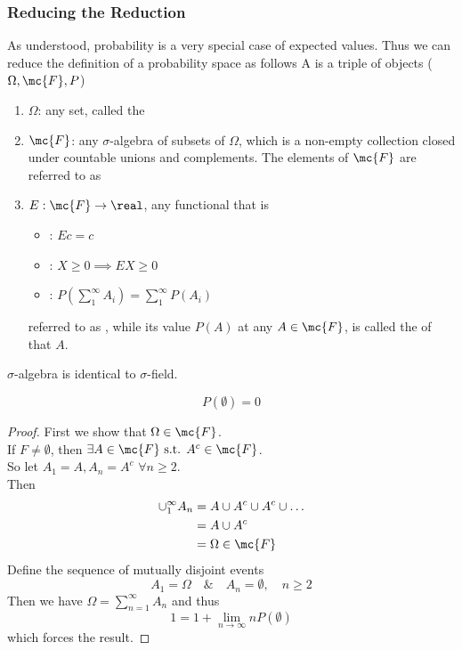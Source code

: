 \documentclass[11pt]{article}
\numberwithin{equation}{section}
\begin{document}
\subsubsection{Reducing the Reduction}
As understood, probability is a very special case of expected values. Thus we can reduce the definition of a probability space as follows
A  is a triple of objects ($\Omega, \mc{F}, P$)
\begin{enumerate}
	\item $\Omega$: any set, called the 
	\item $\mc{F}$: any $\sigma$-algebra of subsets of $\Omega$, which is a non-empty collection closed under countable unions and complements. The elements of $\mc{F}$ are referred to as 
	\item $E: \mc{F} \rightarrow \real$, any functional that is 
	\begin{itemize}
		\item {}: $Ec = c$
		\item {}: $X \geq 0 \implies EX \geq 0$
		\item {}: $P(\sum_1^{\infty}A_i) = \sum_1^{\infty}P(A_i)$
	\end{itemize}
	referred to as , while its value $P(A)$ at any $A \in \mc{F}$, is called the  of that $A$.
\end{enumerate} 

\remark
$\sigma$-algebra is identical to $\sigma$-field.

\proposition[nullity]
$$P(\emptyset) = 0$$
\begin{proof}
	First we show that $\Omega \in \mc{F}$. \\
	If $F \neq \emptyset$, then $\exists A \in \mc{F} \text{ s.t. } A^c \in \mc{F}$. \\
	So let $A_1 = A, A_n = A^c \,\, \forall n \geq 2$. \\
	Then 
	\begin{align*}
		\cup_1^\infty A_n &= A \cup A^c \cup A^c \cup \hdots \\
		&= A \cup A^c \\
		&= \Omega \in \mc{F}
	\end{align*}
	Define the sequence of mutually disjoint events
	$$A_1 = \Omega \quad \& \quad A_n = \emptyset, \quad n \geq 2$$
	Then we have $\Omega = \sum_{n=1}^\infty A_n$ and thus 
	$$ 1 = 1 + \lim_{n\rightarrow\infty} nP(\emptyset)$$
	which forces the result.
\end{proof}
\end{document}
